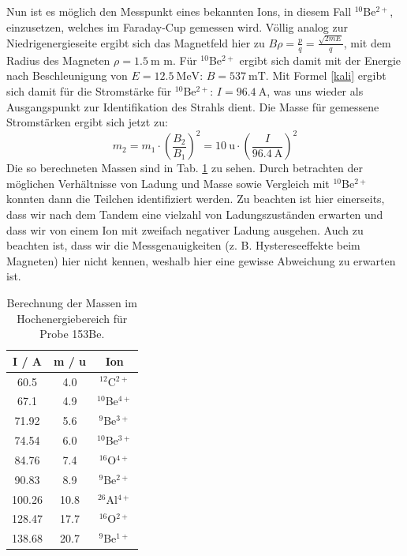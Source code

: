 Nun ist es möglich den Messpunkt eines bekannten Ions, in diesem Fall $^{10}$Be$^{2+}$, einzusetzen, welches im Faraday-Cup gemessen wird.
Völlig analog zur Niedrigenergieseite ergibt sich das Magnetfeld hier zu $B \rho = \frac{p}{q} = \frac{\sqrt{2mE}}{q}$, mit dem Radius des Magneten $\rho = \SI{1.5}{\metre}$ m.
Für $^{10}$Be$^{2+}$ ergibt sich damit mit der Energie nach Beschleunigung von $E = \SI{12.5}{\mega\electronvolt}$: $B = \SI{537}{\milli\tesla}$.
Mit Formel \ref{kali} ergibt sich damit für die Stromstärke für $^{10}$Be$^{2+}$: $I = \SI{96.4}{\ampere}$, was uns wieder als Ausgangspunkt zur Identifikation des Strahls dient.
Die Masse für gemessene Stromstärken ergibt sich jetzt zu:
\begin{equation}
m_2 = m_1 \cdot \left( \frac{B_2}{B_1} \right)^2 = \SI{10}{\atomicmassunit} \cdot \left( \frac{I}{\SI{96.4}{\ampere}} \right)^{2}
\end{equation}
Die so berechneten Massen sind in Tab. \ref{highenergy} zu sehen.
Durch betrachten der möglichen Verhältnisse von Ladung und Masse sowie Vergleich mit $^{10}$Be$^{2+}$ konnten dann die Teilchen identifiziert werden.
Zu beachten ist hier einerseits, dass wir nach dem Tandem eine vielzahl von Ladungszuständen erwarten und dass wir von einem Ion mit zweifach negativer Ladung ausgehen.
Auch zu beachten ist, dass wir die Messgenauigkeiten (z. B. Hystereseeffekte beim Magneten) hier nicht kennen, weshalb hier eine gewisse Abweichung zu erwarten ist.

\begin{table}[h]
\centering
\caption{Berechnung der Massen im Hochenergiebereich für Probe 153Be.}
\begin{tabular}{|c |c| c|}
\hline
I / \si{A} & m / \si{\atomicmassunit} & Ion \\
\hline
\num{60.5}   & \num{4.0}  &  $^{12}$C$^{2+}$  \\
\num{67.1}   & \num{4.9}  &  $^{10}$Be$^{4+}$ \\
\num{71.92}  & \num{5.6}  &  $^{9}$Be$^{3+}$  \\
\num{74.54}  & \num{6.0}  &  $^{10}$Be$^{3+}$ \\
\num{84.76}  & \num{7.4}  &  $^{16}$O$^{4+}$  \\
\num{90.83}  & \num{8.9}  &  $^{9}$Be$^{2+}$  \\
\num{100.26} & \num{10.8} &  $^{26}$Al$^{4+}$ \\
\num{128.47} & \num{17.7} &  $^{16}$O$^{2+}$  \\
\num{138.68} & \num{20.7} &  $^{9}$Be$^{1+}$  \\
\hline
\end{tabular}
\label{highenergy}
\end{table}

